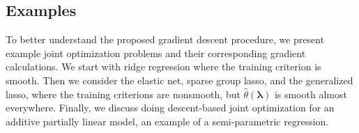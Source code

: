 \documentclass[10pt,letterpaper]{article}
\begin{document}
\begin{algorithm}
\begin{algorithmic}
	\ENDFOR
  \end{algorithmic}
\end{algorithm}

\subsection{Examples}

To better understand the proposed gradient descent procedure, we present example joint optimization problems and their corresponding gradient calculations. We start with ridge regression where the training criterion is smooth. Then we consider the elastic net, sparse group lasso, and the generalized lasso, where the training criterions are nonsmooth, but $\hat{\theta}(\boldsymbol\lambda)$ is smooth almost everywhere. Finally, we discuss doing descent-based joint optimization for an additive partially linear model, an example of a semi-parametric regression.
\end{document}
